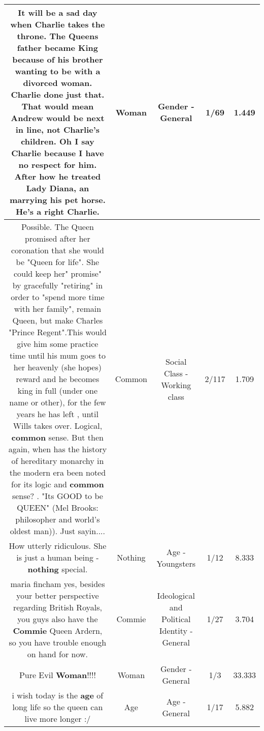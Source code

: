 \documentclass[11pt]{article}
\newlength\mylength
\begin{document}
\begin{center}
\begin{longtable}{|C{.65\mylength}|C{.30\mylength}|C{.12\mylength}|C{.12\mylength}|C{.12\mylength}|}
  \small It will be a sad day when Charlie takes the throne. The Queens father became King because of his brother wanting to be with a divorced \textbf{woman}. Charlie done just that. That would mean  Andrew would be next in line, not Charlie's children. Oh I say Charlie because I have no respect for him. After how he treated Lady Diana, an marrying his pet horse. He's a right Charlie.\normalsize   & Woman & Gender - General & 1/69 & 1.449 \\  \hline
  \small Possible. The Queen promised after her coronation that she would be "Queen for life". She could keep her" promise" by gracefully "retiring" in order to "spend more time with her family", remain Queen, but make Charles "Prince Regent".This would give him some practice time until his mum goes to her heavenly (she hopes) reward and he becomes king in full (under one name or other), for the few years he has left , until Wills takes over. Logical, \textbf{common} sense. But then again, when has the history of hereditary monarchy in the modern era been noted for its logic and \textbf{common} sense? . "Its GOOD to be QUEEN" (Mel Brooks: philosopher and world's oldest man)). Just sayin....\normalsize   & Common & Social Class - Working class & 2/117 & 1.709 \\  \hline
  \small How utterly ridiculous. She is just a human being - \textbf{nothing} special.\normalsize   & Nothing & Age - Youngsters & 1/12 & 8.333 \\  \hline
  \small maria fincham yes, besides your better perspective regarding British Royals, you guys also have the \textbf{Commie} Queen Ardern, so you have trouble enough on hand for now.\normalsize   & Commie &  Ideological and Political Identity - General & 1/27 & 3.704 \\  \hline
  \small Pure Evil \textbf{Woman}!!!!\normalsize   & Woman & Gender - General & 1/3 & 33.333 \\  \hline
  \small i wish today is the \textbf{age} of long life so the queen can live more longer :/\normalsize   & Age & Age - General & 1/17 & 5.882 \\  \hline

\end{longtable}
\end{center}
\end{document}
